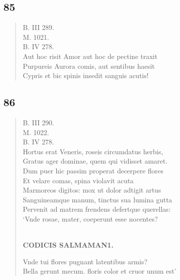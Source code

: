 \documentclass[11pt, a4paper]{report}
\begin{document}
            \subsection*{85}
      \begin{verse}
      B. III 289. \\ M. 1021. \\ B. IV 278. \\ Aut hoc risit Amor aut hoc de pectine traxit \\ Purpureis Aurora comis, aut sentibus haesit \\ Cypris et bic spinis insedit sanguis acutis! \\ 
      \end{verse}
  
            \subsection*{86}
      \begin{verse}
      B. III 290. \\ M. 1022. \\ B. IV 278. \\ Hortus erat Veneris, roseis circumdatus herbis, \\ Gratus ager dominae, quem qui vidisset amaret. \\ Dum puer hic passim properat decerpere flores \\ Et velare comas, spina violavit acuta \\ Marmoreos digitos: mox ut dolor adtigit artus \\ Sanguineamque manum, tinctus sua lumina gutta \\ Pervenit ad matrem frendens defertque querellas: \\ ‘Vnde rosae, mater, coeperunt esse nocentes? \\ 
        ﻿\pagebreak 
    \begin{center} \textbf{CODICIS SALMAMAN1.} \end{center} \marginpar{[0]} Vnde tui flores pugnant latentibus armis? \\ Bella gerunt mecum. floris color et cruor unum est’ \\ 
      \end{verse}
  
\end{document}
